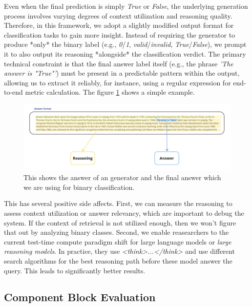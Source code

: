 Even when the final prediction is simply \textit{True} or \textit{False}, the underlying generation process involves varying degrees of context utilization and reasoning quality. Therefore, in this framework, we adopt a slightly modified output format for classification tasks to gain more insight. Instead of requiring the generator to produce *only* the binary label (e.g., \textit{0}/\textit{1}, \textit{valid}/\textit{invalid}, \textit{True}/\textit{False}), we prompt it to also output its reasoning *alongside* the classification verdict. The primary technical constraint is that the final answer label itself (e.g., the phrase \textit{'The answer is "True"'}) must be present in a predictable pattern within the output, allowing us to extract it reliably, for instance, using a regular expression for end-to-end metric calculation. The figure \ref{fig:answerreason} shows a simple example.

\begin{figure}
  \centering
  \includegraphics[width=\textwidth]{images/Answer-vs-Reasoning.pdf}
  \caption{This shows the answer of an generator and the final answer which we are using for binary classification.}
  \label{fig:answerreason}
\end{figure}

This has several positive side affects. First, we can measure the reasoning to assess context utilization or answer relevancy, which are important to debug the system. If the context of retrieval is not utilized enough, then we won't figure that out by analyzing binary classes. Second, we enable reasearchers to the current test-time compute paradigm shift for large language models or \textit{large reasoning models}. In practice, they use \textit{<think>...</think>} and use different search algorithms for the best reasoning path before these model answer the query. This leads to significantly better results.\cite{Xu.16.01.2025}


\subsection{Component Block Evaluation}

